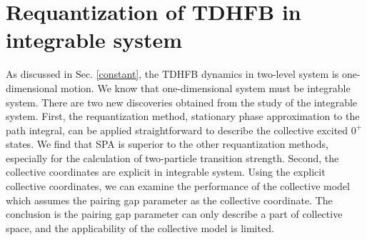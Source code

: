 \documentclass[11pt]{book} %
\begin{document}
\chapter{Requantization of TDHFB in integrable system}
\label{integrable}
As discussed in Sec. \ref{constant}, the TDHFB dynamics in two-level system is one-dimensional motion. We know that one-dimensional system must be integrable system. 
There are two new discoveries obtained from the study of the integrable system. First, the requantization method, stationary phase approximation to the path integral, can be applied straightforward to describe the collective excited $0^+$ states. We find that SPA is superior to the other requantization methods, especially for the calculation of two-particle transition strength. Second, the collective coordinates are explicit in integrable system. Using the explicit collective coordinates, we can examine the performance of the collective model which assumes the pairing gap parameter as the collective coordinate. The conclusion is the pairing gap parameter can only describe a part of collective space, and the applicability of the collective model is limited.
\end{document}
